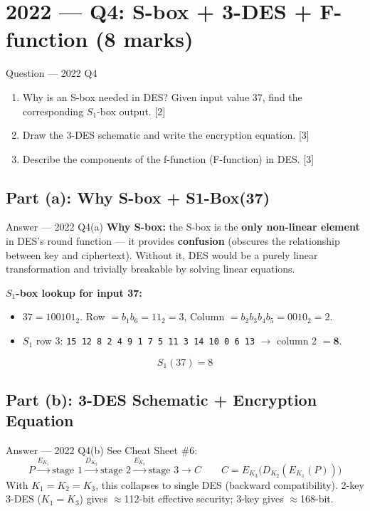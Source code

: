 \documentclass[12pt,a4paper]{article}
\begin{document}
\newpage
\section{2022 --- Q4: S-box + 3-DES + F-function (8 marks)}

\begin{qbox}{Question --- 2022 Q4}
\begin{enumerate}[label=(\alph*)]
  \item Why is an S-box needed in DES? Given input value 37, find the corresponding $S_1$-box output. \hfill [2]
  \item Draw the 3-DES schematic and write the encryption equation. \hfill [3]
  \item Describe the components of the f-function (F-function) in DES. \hfill [3]
\end{enumerate}
\end{qbox}

\subsection{Part (a): Why S-box + S1-Box(37)}
\begin{solbox}{Answer --- 2022 Q4(a)}
\textbf{Why S-box:} the S-box is the \textbf{only non-linear element} in DES's round function --- it provides \textbf{confusion} (obscures the relationship between key and ciphertext). Without it, DES would be a purely linear transformation and trivially breakable by solving linear equations.

\textbf{$S_1$-box lookup for input 37:}
\begin{itemize}[noitemsep]
  \item $37 = 100101_2$. Row $=b_1b_6=11_2=3$, Column $=b_2b_3b_4b_5=0010_2=2$.
  \item $S_1$ row 3: \texttt{15 12 8 2 4 9 1 7 5 11 3 14 10 0 6 13} $\to$ column 2 $=\mathbf{8}$.
\end{itemize}
\[
\boxed{S_1(37) = 8}
\]
\end{solbox}

\subsection{Part (b): 3-DES Schematic + Encryption Equation}
\begin{solbox}{Answer --- 2022 Q4(b)}
See Cheat Sheet \#6:
\[
P \xrightarrow{E_{K_1}} \boxed{\text{stage 1}} \xrightarrow{D_{K_2}} \boxed{\text{stage 2}} \xrightarrow{E_{K_3}} \boxed{\text{stage 3}} \rightarrow C
\qquad
C = E_{K_3}\big(D_{K_2}(E_{K_1}(P))\big)
\]
With $K_1=K_2=K_3$, this collapses to single DES (backward compatibility). 2-key 3-DES ($K_1=K_3$) gives $\approx$112-bit effective security; 3-key gives $\approx$168-bit.
\end{solbox}
\end{document}
